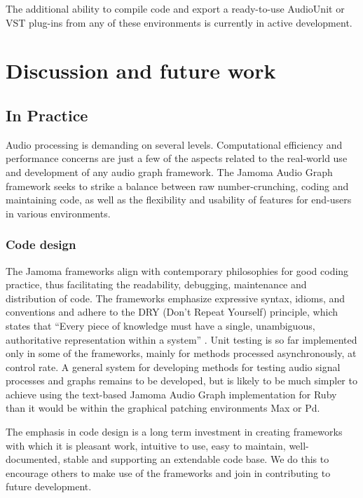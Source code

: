 \documentclass[twoside,a4paper]{article}
\begin{document}
The additional ability to compile code and export a ready-to-use AudioUnit or VST plug-ins from any of these environments is currently in active development.





%
\section{Discussion and future work} %
%

\subsection{In Practice} %

Audio processing is demanding on several levels.  
Computational efficiency and performance concerns are just a few of the aspects related to the real-world use and development of any audio graph framework. 
The Jamoma Audio Graph framework seeks to strike a balance between raw number-crunching, coding and maintaining code, as well as the flexibility and usability of features for end-users in various environments.


\subsubsection{Code design} %

The Jamoma frameworks align with contemporary philosophies for good coding practice, thus facilitating the readability, debugging, maintenance and distribution of code.
The frameworks emphasize expressive syntax, idioms, and conventions \cite{Martin:2009} and adhere to the DRY (Don't Repeat Yourself) principle, which states that ``Every piece of knowledge must have a single, unambiguous, authoritative representation within a system'' \cite{Hunt:1999}.
Unit testing is so far implemented only in some of the frameworks, mainly for methods processed asynchronously, at control rate.
A general system for developing methods for testing audio signal processes and graphs remains to be developed, but is likely to be much simpler to achieve using the text-based Jamoma Audio Graph implementation for Ruby than it would be within the graphical patching environments Max or Pd.

The emphasis in code design is a long term investment in creating frameworks with which it is pleasant work, intuitive to use, easy to maintain, well-documented, stable and supporting an extendable code base.  We do this to encourage others to make use of the frameworks and join in contributing to future development.
\end{document}
